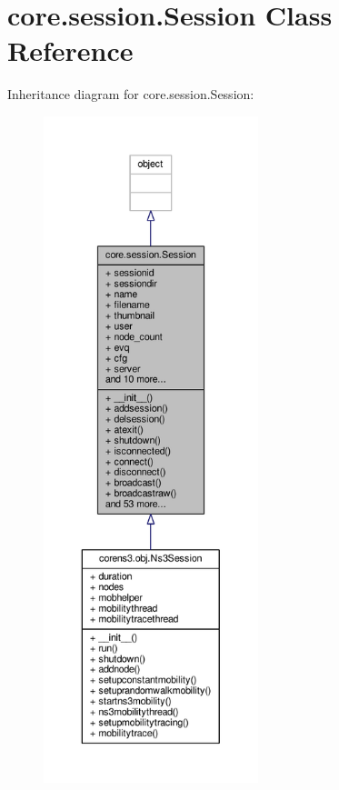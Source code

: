 \hypertarget{classcore_1_1session_1_1_session}{\section{core.\+session.\+Session Class Reference}
\label{classcore_1_1session_1_1_session}
}


Inheritance diagram for core.\+session.\+Session\+:
\nopagebreak
\begin{figure}[H]
\begin{center}
\leavevmode
\includegraphics[height=550pt]{classcore_1_1session_1_1_session__inherit__graph}
\end{center}
\end{figure}


